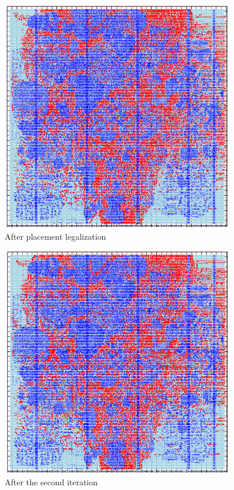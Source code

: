 \documentclass[12pt]{article}
\begin{document}
\begin{figure}[htbp]
    \centering
    \includegraphics[width=0.9\textwidth]{results/legal.png}
    \caption{After placement legalization}
    \label{fig:legal}
\end{figure}

\begin{figure}[htbp]
    \centering
    \includegraphics[width=0.9\textwidth]{results/second_iter.png}
    \caption{After the second iteration}
    \label{fig:second_iter}
\end{figure}
\end{document}

